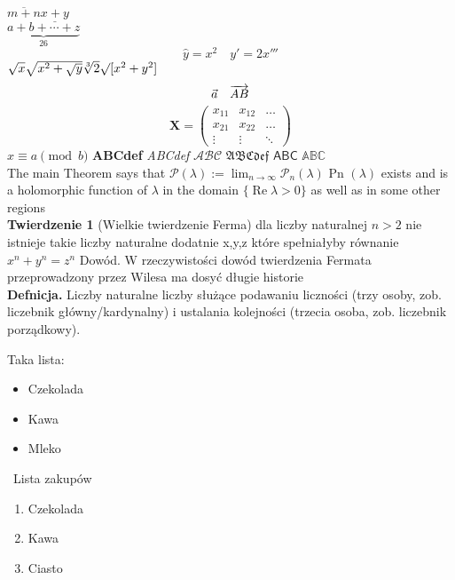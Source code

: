 \documentclass[a4paper]{article}
\begin{document}
$\overline{m+n}\underline{x+y}$\\[6pt]
$\underbrace{a+b+\cdots+z}_{26}$
\begin{displaymath}
\hat{y}=x^{2}\quad y' = 2x'''
\end{displaymath}
$\sqrt{x} \sqrt{ x^{2}+\sqrt{y}}
 \sqrt[3]{2} \surd[x^2 + y^2]$
 \begin{displaymath}
 \vec a\quad\overrightarrow{AB}\\[6pt]
 \end{displaymath}
 \begin{displaymath}
 \mathbf{X} =
 \left( \begin{array}{ccc}
 x_{11} & x_{12} & \ldots \\
 x_{21} & x_{22} & \ldots \\
 \vdots & \vdots & \ddots
 \end{array} \right)
 \end{displaymath}
$x\equiv a \pmod{b}$
\textbf{ABCdef}
\textit{ABCdef}
$\mathcal{ABC}$
$\mathfrak{ABCdef}$
$\textsf{ABC}$
$\mathbb{ABC}$
\\The main Theorem says that $
\mathcal{P}(\lambda) := \lim_{n \to \infty} \mathcal{P}_n(\lambda)
$
 Pn $(\lambda)$ exists and is a holomorphic
 function of $\lambda$ in the domain  $\{ \operatorname{Re} \lambda > 0 \}$ as well as in some other regions
 \\ \textbf{Twierdzenie 1} (Wielkie twierdzenie Ferma) dla liczby naturalnej $n > 2$ nie
 istnieje takie liczby naturalne dodatnie x,y,z które spełniałyby równanie
 $x^n +y^n =z^n$
 Dowód. W rzeczywistości dowód twierdzenia Fermata przeprowadzony przez
 Wilesa ma dosyć długie historie
\\ \textbf{Defnicja.} Liczby naturalne liczby służące podawaniu liczności (trzy osoby,
 zob. liczebnik główny/kardynalny) i ustalania kolejności (trzecia osoba, zob.
 liczebnik porządkowy).

 Taka lista:
 \begin{itemize}
 \item Czekolada
 \item Kawa
\item Mleko
 \end{itemize}
\ Lista zakupów
 \begin{enumerate}
\item Czekolada
\item Kawa
\item Ciasto
  \end{enumerate}
\end{document}
